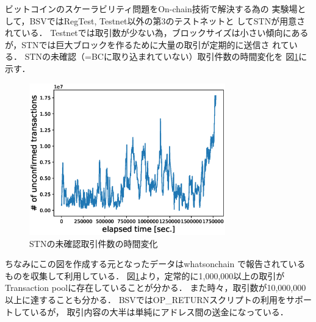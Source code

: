 \documentclass[graybox]{svmult}
\begin{document}
ビットコインのスケーラビリティ問題をOn-chain技術で解決する為の
実験場として，BSVではRegTest, Testnet以外の第3のテストネットと
してSTNが用意されている．
Testnetでは取引数が少ない為，ブロックサイズは小さい傾向にある
が，STNでは巨大ブロックを作るために大量の取引が定期的に送信さ
れている．
STNの未確認（=BCに取り込まれていない）取引件数の時間変化を
図\ref{fig:unconfirmed_tx}に示す．
%
\begin{figure}[tb]
  \vspace{-20mm}
  \begin{center}
    \includegraphics[width=85mm]{time_vs_tx-plot.eps}
  \end{center}
  \vspace{20mm}
  \caption{STNの未確認取引件数の時間変化}
  \label{fig:unconfirmed_tx}
\end{figure}
%






ちなみにこの図を作成する元となったデータはwhatsonchain \cite{woc} 
で報告されているものを収集して利用している．
図\ref{fig:unconfirmed_tx}より，定常的に1,000,000以上の取引が
Transaction poolに存在していることが分かる．
また時々，取引数が10,000,000以上に達することも分かる．
BSVではOP\_RETURNスクリプトの利用をサポートしているが，
取引内容の大半は単純にアドレス間の送金になっている．
\end{document}
